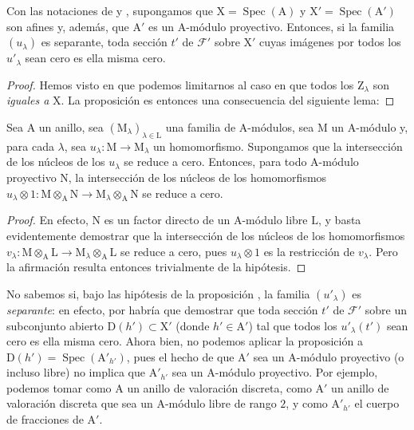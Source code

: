 \begin{proposition}[11.9.7]
\label{IV.11.9.7}
Con las notaciones de  y , supongamos que $\mathrm{X}=\operatorname{Spec}(\mathrm{A})$ y $\mathrm{X}'=\operatorname{Spec}(\mathrm{A}')$ son afines y, además, que $\mathrm{A}'$ es un $\mathrm{A}$-módulo proyectivo.
Entonces, si la familia $(u_\lambda)$ es separante, toda sección $t'$ de $\mathscr{F}'$ sobre $\mathrm{X}'$ cuyas imágenes por todos los $u'_\lambda$ sean cero es ella misma cero.
\end{proposition}

\begin{proof}
Hemos visto en  que podemos limitarnos al caso en que todos los $\mathrm{Z}_\lambda$ son \emph{iguales a} $\mathrm{X}$.
La proposición es entonces una consecuencia del siguiente lema:
\end{proof}

\begin{lemma}[11.9.7.1]
\label{IV.11.9.7.1}
Sea $\mathrm{A}$ un anillo, sea $(\mathrm{M}_\lambda)_{\lambda\in\mathrm{L}}$ una familia de $\mathrm{A}$-módulos, sea $\mathrm{M}$ un $\mathrm{A}$-módulo y, para cada $\lambda$, sea $u_\lambda:\mathrm{M}\to\mathrm{M}_\lambda$ un homomorfismo.
Supongamos que la intersección de los núcleos de los $u_\lambda$ se reduce a cero.
Entonces, para todo $\mathrm{A}$-módulo proyectivo $\mathrm{N}$, la intersección de los núcleos de los homomorfismos $u_\lambda\otimes 1:\mathrm{M}\otimes_\mathrm{A}\mathrm{N}\to\mathrm{M}_\lambda\otimes_\mathrm{A}\mathrm{N}$ se reduce a cero.
\end{lemma}

\begin{proof}
En efecto, $\mathrm{N}$ es un factor directo de un $\mathrm{A}$-módulo libre $\mathrm{L}$, y basta evidentemente demostrar que la intersección de los núcleos de los homomorfismos $v_\lambda:\mathrm{M}\otimes_\mathrm{A}\mathrm{L}\to\mathrm{M}_\lambda\otimes_\mathrm{A}\mathrm{L}$ se reduce a cero, pues $u_\lambda\otimes 1$ es la restricción de $v_\lambda$.
Pero la afirmación resulta entonces trivialmente de la hipótesis.
\end{proof}

\begin{remarks}[11.9.8]
\label{IV.11.9.8}
No sabemos si, bajo las hipótesis de la proposición , la familia $(u'_\lambda)$ es \emph{separante}: en efecto, por  habría que demostrar que toda sección $t'$ de $\mathscr{F}'$ sobre un subconjunto abierto $\mathrm{D}(h')\subset\mathrm{X}'$ (donde $h'\in\mathrm{A}'$) tal que todos los $u'_\lambda(t')$ sean cero es ella misma cero.
Ahora bien, no podemos aplicar la proposición  a $\mathrm{D}(h')=\operatorname{Spec}(\mathrm{A}'_{h'})$, pues el hecho de que $\mathrm{A}'$ sea un $\mathrm{A}$-módulo proyectivo (o incluso libre) no implica que $\mathrm{A}'_{h'}$ sea un $\mathrm{A}$-módulo proyectivo.
Por ejemplo, podemos tomar como $\mathrm{A}$ un anillo de valoración discreta, como $\mathrm{A}'$ un anillo de valoración discreta que sea un $\mathrm{A}$-módulo libre de rango $2$, y como $\mathrm{A}'_{h'}$ el cuerpo de fracciones de $\mathrm{A}'$.
\end{remarks}

